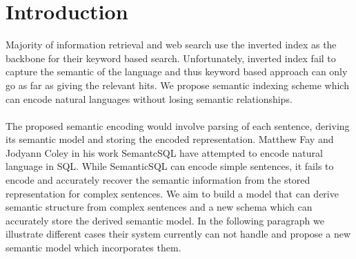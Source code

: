 \documentclass[10pt]{article}
\begin{document}
 


\section{Introduction}
Majority of information retrieval and web search use the inverted index as the backbone for their keyword based search. Unfortunately, inverted index fail to capture the semantic of the language and thus keyword based approach can only go as far as giving the relevant hits. We propose semantic indexing scheme which can encode natural languages without losing semantic relationships.
 \\
 \\
The proposed semantic encoding would involve parsing of each sentence, deriving its semantic model and storing the encoded representation. Matthew Fay and Jodyann Coley in his work SemantcSQL have attempted to encode natural language in SQL. While SemanticSQL can encode simple sentences, it fails to encode and accurately recover the semantic information from the stored representation for complex sentences. We aim to build a model that can derive semantic structure from complex sentences and a new schema which can accurately store the derived semantic model. In the following paragraph we illustrate different cases their system currently can not handle and propose a new semantic model which incorporates them.
\end{document}
